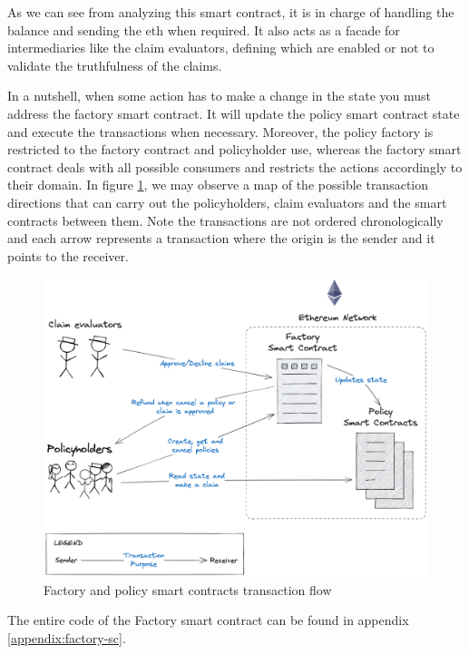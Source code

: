 {As we can see from analyzing this smart contract, it is in charge of handling the balance and sending the \acrshort{eth} when required. It also acts as a facade for intermediaries like the claim evaluators, defining which are enabled or not to validate the truthfulness of the claims. 

In a nutshell, when some action has to make a change in the state you must address the factory smart contract. It will update the policy smart contract state and execute the transactions when necessary. Moreover, the policy factory is restricted to the factory contract and policyholder use, whereas the factory smart contract deals with all possible consumers and restricts the actions accordingly to their domain. In figure \ref{fig:smart-contracts-flow}, we may observe a map of the possible transaction directions that can carry out the policyholders, claim evaluators and the smart contracts between them. Note the transactions are not ordered chronologically and each arrow represents a transaction where the origin is the sender and it points to the receiver. 

\begin{figure}[H]
\centering
\includegraphics[width=14cm]{img/project-development/factory-policy.png}
\caption[Factory and policy smart contracts transaction flow]{\footnotesize{Factory and policy smart contracts transaction flow}}
\label{fig:smart-contracts-flow}
\end{figure}

The entire code of the Factory smart contract can be found in appendix \ref{appendix:factory-sc}.
}

